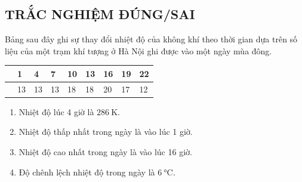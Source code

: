 \subsection{TRẮC NGHIỆM ĐÚNG/SAI}
\setcounter{ex}{0}

\begin{ex}
		Bảng sau đây ghi sự thay đổi nhiệt độ của không khí theo thời gian dựa trên số liệu của một trạm khí tượng ở Hà Nội ghi được vào một ngày mùa đông.
	\begin{center}
		\begin{tabular}{|C{8em}|C{1.5em}|C{1.5em}|C{1.5em}|C{1.5em}|C{1.5em}|C{1.5em}|C{1.5em}|C{1.5em}|}
			\hline
			& 1 & 4 & 7 & 10 & 13 & 16 & 19 & 22\\
			\hline
			 & 13 & 13 &13 & 18& 18 & 20 & 17 & 12\\
			\hline
		\end{tabular}
	\end{center}
	\begin{enumerate}[label=\alph*)]
		\item Nhiệt độ lúc 4 giờ là $\SI{286}{\kelvin}$.
		\item Nhiệt độ thấp nhất trong ngày là vào lúc 1 giờ.
		\item Nhiệt độ cao nhất trong ngày là vào lúc 16 giờ.
		\item Độ chênh lệch nhiệt độ trong ngày là $\SI{6}{\celsius}$.
	\end{enumerate}
	\end{ex}

